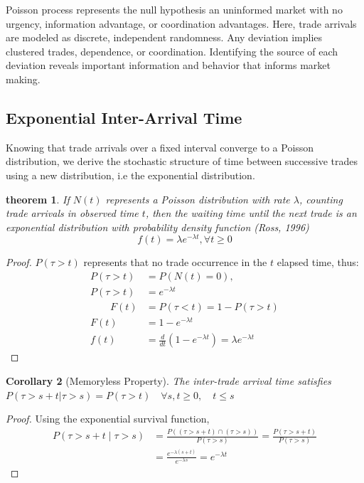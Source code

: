 \documentclass[12pt]{article}
\theoremstyle{plain}
\newtheorem{theorem}{theorem}[section]
\newtheorem{corollary}[theorem]{Corollary}
\theoremstyle{definition}
\numberwithin{equation}{section}
\begin{document}
Poisson process represents the null hypothesis an uninformed market with no urgency,  information advantage, or coordination advantages. Here, trade arrivals are modeled as discrete, independent randomness. Any deviation implies clustered trades, dependence, or coordination. Identifying the source of each deviation reveals important information and behavior that informs market making.

\subsection{Exponential Inter-Arrival Time}
Knowing that trade arrivals over a fixed interval converge to a Poisson distribution, we derive the stochastic structure of time between successive trades using a new distribution, i.e the exponential distribution.

\begin{theorem}
If ${N(t)}$ represents a Poisson distribution with rate $\lambda$, counting trade arrivals in observed time $t$, then the waiting time until the next trade is an exponential distribution with probability density function (Ross, 1996)
\begin{equation}
f(t) = \lambda e^{ - \lambda t}, \forall t \geq 0
\end{equation}
\end{theorem}
\begin{proof}
$P(\tau > t)$ represents that no trade occurrence in the $t$ elapsed time, thus:
\begin{align}
P(\tau > t) &= P(N(t) = 0),\\ 
P(\tau > t) &= e^{ - \lambda t}\\
\qquad F(t)&=P(\tau < t) = 1  -  P(\tau > t)\\
F(t)&= 1 -e^{-\lambda t}\\
 f(t) &= \frac{d}{dt}\left(1  -  e^{ - \lambda t}\right) = \lambda e^{ - \lambda t}
\end{align}
\end{proof}
\begin{corollary}[Memoryless Property]
The inter-trade arrival time satisfies $P(\tau>s+t| \tau >s)=P(\tau>t)\quad \forall s,t \geq 0,\quad t \leq s$ 
\end{corollary}
\begin{proof}
 Using the exponential survival function,
\begin{align}
P(\tau>s+t∣\tau>s)&= \frac{P((\tau >s+t) \cap (\tau >s))}{P(\tau>s)} = \frac{P(\tau > s+t)}{P(\tau > s)}\\
 &= \frac{e^{ - \lambda(s+t)}}{e^{ - \lambda s}} 
 = e^{ - \lambda t}
\end{align}
\end{proof}
\end{document}
